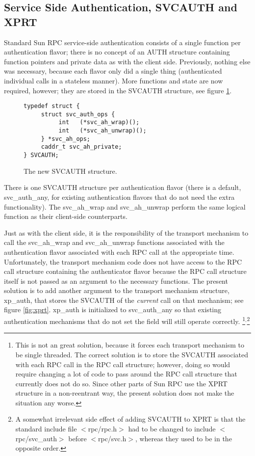 \subsection{Service Side Authentication, SVCAUTH and XPRT}

Standard Sun RPC service-side authentication consists of a single
function per authentication flavor; there is no concept of an AUTH
structure containing function pointers and private data as with the
client side.  Previously, nothing else was necessary, because each
flavor only did a single thing (authenticated individual calls in a
stateless manner).  More functions and state are now required,
however; they are stored in the SVCAUTH structure, see figure
\ref{fig:svcauth}.

\begin{figure}[htbp]
\begin{verbatim}
typedef struct {
     struct svc_auth_ops {
          int   (*svc_ah_wrap)();
          int   (*svc_ah_unwrap)();
     } *svc_ah_ops;
     caddr_t svc_ah_private;
} SVCAUTH;
\end{verbatim}
\caption{The new SVCAUTH structure.}
\label{fig:svcauth}
\end{figure}

There is one SVCAUTH structure per authentication flavor (there is a
default, svc_auth_any, for existing authentication flavors that do not
need the extra functionality).  The svc_ah_wrap and svc_ah_unwrap
perform the same logical function as their client-side counterparts.

Just as with the client side, it is the responsibility of the
transport mechanism to call the svc_ah_wrap and svc_ah_unwrap
functions associated with the authentication flavor associated with
each RPC call at the appropriate time.  Unfortunately, the transport
mechanism code does not have access to the RPC call structure
containing the authenticator flavor because the RPC call structure
itself is not passed as an argument to the necessary functions.  The
present solution is to add another argument to the transport mechanism
structure, xp_auth, that stores the SVCAUTH of the {\it current} call
on that mechanism; see figure \ref{fig:xprt}.  xp_auth is initialized
to svc_auth_any so that existing authentication mechanisms that do not
set the field will still operate correctly.  \footnote{This is not an
great solution, because it forces each transport mechanism to be
single threaded.  The correct solution is to store the SVCAUTH
associated with each RPC call in the RPC call structure; however,
doing so would require changing a lot of code to pass around the RPC
call structure that currently does not do so.  Since other parts of
Sun RPC use the XPRT structure in a non-reentrant way, the present
solution does not make the situation any
worse.}$^{\mbox{,}}$\footnote{A somewhat irrelevant side effect of
adding SVCAUTH to XPRT is that the standard include file
$<$rpc/rpc.h$>$ had to be changed to include $<$rpc/svc_auth$>$ before
$<$rpc/svc.h$>$, whereas they used to be in the opposite order.}

